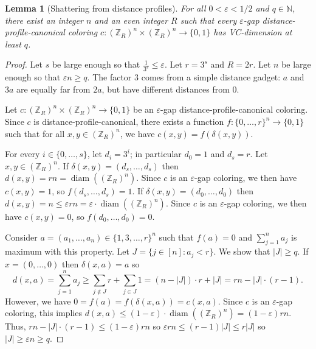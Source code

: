 \documentclass[11pt]{article}
\DeclareMathOperator{\diam}{diam}
\newtheorem{lemma}[theorem]{Lemma}
\theoremstyle{remark}
\begin{document}
\begin{lemma}[Shattering from distance profiles]\label{lem:large-vc}
    For all $0 < \varepsilon < 1/2$ and $q \in \mathbb{N}$, there exist an integer $n$ and an even integer $R$ such that every $\varepsilon$-gap distance-profile-canonical coloring $c : (\mathbb{Z}_{R})^n \times (\mathbb{Z}_{R})^n \to \{0, 1\}$ has VC-dimension at least $q$.
\end{lemma}

\begin{proof}
    Let $s$ be large enough so that $\frac{1}{3^s} \leq \varepsilon$.
    Let $r = 3^s$ and $R = 2r$.
    Let $n$ be large enough so that $\varepsilon n \geq q$.
    The factor $3$ comes from a simple distance gadget: $a$ and $3a$ are equally far from $2a$, but have different distances from $0$.
    
    Let $c : (\mathbb{Z}_{R})^n \times (\mathbb{Z}_{R})^n \to \{0, 1\}$ be an $\varepsilon$-gap distance-profile-canonical coloring.
    Since $c$ is distance-profile-canonical, there exists a function $f : \{0, \ldots, r\}^n \to \{0, 1\}$ such that for all $x, y \in (\mathbb{Z}_{R})^n$, we have $c(x, y) = f(\delta(x, y))$.
    
    For every $i \in \{0, \ldots, s\}$, let $d_i = 3^i$; in particular $d_0 = 1$ and $d_s = r$.
    Let $x, y \in (\mathbb{Z}_{R})^n$.
    If $\delta(x, y) = (d_s, \ldots, d_s)$ then $d(x, y) = rn = \diam((\mathbb{Z}_{R})^n)$.
    Since $c$ is an $\varepsilon$-gap coloring, we then have $c(x, y) = 1$, so $f(d_s, \ldots, d_s) = 1$.
    If $\delta(x, y) = (d_0, \ldots, d_0)$ then $d(x, y) = n \leq \varepsilon rn = \varepsilon \cdot  \diam((\mathbb{Z}_{R})^n)$.
    Since $c$ is an $\varepsilon$-gap coloring, we then have $c(x, y) = 0$, so $f(d_0, \ldots, d_0) = 0$.
    
    Consider $a = (a_1, \ldots, a_n) \in \{1, 3, \ldots, r\}^n$ such that $f(a) = 0$ and $\sum_{j = 1}^n a_j$ is maximum with this property.
    Let $J = \{j \in [n] : a_j < r\}$.
    We show that $|J| \geq q$.
    If $x = (0, \ldots, 0)$ then $\delta(x, a) = a$ so \[d(x, a) = \sum_{j = 1}^n a_j \geq \sum_{j \notin J}r + \sum_{j \in J}1 = (n-|J|) \cdot r + |J| = rn - |J| \cdot (r-1).\]
    However, we have $0 = f(a) = f(\delta(x, a)) = c(x, a)$. 
    Since $c$ is an $\varepsilon$-gap coloring, this implies $d(x, a) \leq (1-\varepsilon) \cdot \diam((\mathbb{Z}_{R})^n) = (1-\varepsilon)rn$.
    Thus, $rn - |J| \cdot (r-1) \leq (1-\varepsilon)rn$ so $\varepsilon rn \leq (r-1) |J| \leq r|J|$ so $|J| \geq \varepsilon n \geq q$.
    

\end{proof}
\end{document}
